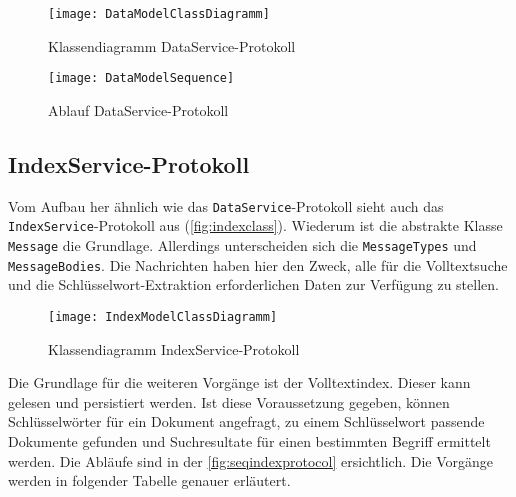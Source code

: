     \begin{figure}[H]
    \centering
    \texttt{[image: DataModelClassDiagramm]}
    \caption{Klassendiagramm DataService-Protokoll}
    \label{fig:dataclass}
    \end{figure}

    \begin{figure}[H]
    \centering
    \texttt{[image: DataModelSequence]}
    \caption{Ablauf DataService-Protokoll}
    \label{fig:seqdataprotocol}
    \end{figure}


\subsection{IndexService-Protokoll}


Vom Aufbau her ähnlich wie das \texttt{DataService}-Protokoll sieht auch das \texttt{IndexService}-Protokoll aus (\autoref{fig:indexclass}). Wiederum ist die abstrakte Klasse \texttt{Message} die Grundlage. Allerdings unterscheiden sich die \texttt{Mes\-sa\-ge\-Typ\-es} und \texttt{MessageBodies}. Die Nachrichten haben hier den Zweck, alle für die Volltextsuche und die Schlüs\-sel\-wort-\-Ex\-trak\-tion erforderlichen Daten zur Verfügung zu stellen.

    
    \begin{figure}[H]
    \centering
    \texttt{[image: IndexModelClassDiagramm]}
    \caption{Klassendiagramm IndexService-Protokoll}
    \label{fig:indexclass}
    \end{figure}

Die Grundlage für die weiteren Vorgänge ist der Volltextindex. Dieser kann gelesen und persistiert werden. Ist diese Voraussetzung gegeben, können Schlüsselwörter für ein Dokument angefragt, zu einem Schlüsselwort passende Dokumente gefunden und Suchresultate für einen bestimmten Begriff ermittelt werden. Die Abläufe sind in der \autoref{fig:seqindexprotocol} ersichtlich. Die Vorgänge werden in folgender Tabelle genauer erläutert.

\newpage

